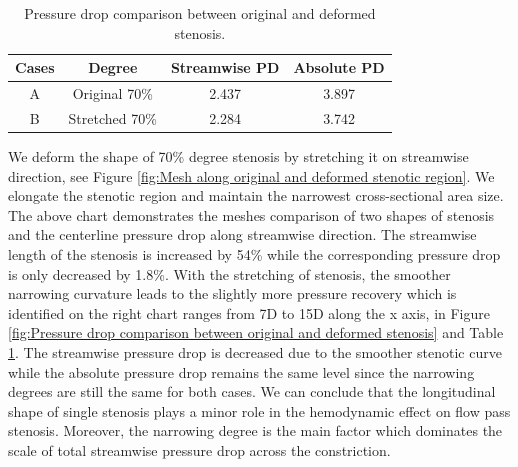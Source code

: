 \begin{table}[h]
	\caption{Pressure drop comparison between original and deformed stenosis.}
	\label{Table: Pressure drop comparison between original and deformed stenosis}
	\vspace{-5pt}
	\begin{center}
		\begin{tabular}{|c|c|c|c|}
			\hline
			\textbf{Cases} &\textbf{Degree} & \textbf{Streamwise PD} & \textbf{Absolute PD}\\
			\hline
			A & Original 70\% & 2.437 & 3.897\\
			\hline
			B & Stretched 70\% & 2.284 & 3.742\\
			\hline
		\end{tabular}
	\end{center} 
\end{table}


We deform the shape of 70\% degree stenosis by stretching it on streamwise direction, see Figure \ref{fig:Mesh along original and deformed stenotic region}.
We elongate the stenotic region and maintain the narrowest cross-sectional area size.
The above chart demonstrates the meshes comparison of two shapes of stenosis and the centerline pressure drop along streamwise direction.
The streamwise length of the stenosis is increased by 54\% while the corresponding pressure drop is only decreased by 1.8\%.
With the stretching of stenosis, the smoother narrowing curvature leads to the slightly more pressure recovery which is identified on the right chart ranges from 7D to 15D along the x axis, in Figure \ref{fig:Pressure drop comparison between original and deformed stenosis} and Table \ref{Table: Pressure drop comparison between original and deformed stenosis}.
The streamwise pressure drop is decreased due to the smoother stenotic curve while the absolute pressure drop remains the same level since the narrowing degrees are still the same for both cases.
We can conclude that the longitudinal shape of single stenosis plays a minor role in the hemodynamic effect on flow pass stenosis.
Moreover, the narrowing degree is the main factor which dominates the scale of total streamwise pressure drop across the constriction.


